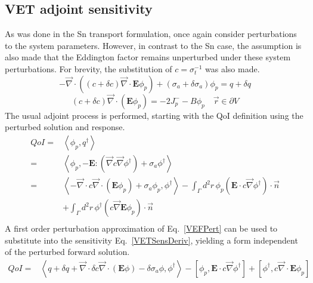 \documentclass{article}
\newcommand{\vr}{\vec{r}}
\newcommand{\bra}{\left\langle}
\newcommand{\ket}{\right\rangle}
\newcommand{\sbra}{\left[}
\newcommand{\sket}{\right]}
\newcommand{\vdiv}{\vec{\nabla} \cdot}
\newcommand{\vgrad}{\vec{\nabla}}
\newcommand{\bound}{\partial V}
\newcommand{\Edd}{\mathbf{E}}
\newcommand{\sigt}{\sigma_t}
\newcommand{\siga}{\sigma_a}
\newcommand{\isigt}{c}
\newcommand{\scalSource}{q}
\newcommand{\scalResp}{q^\dag}
\newcommand{\qoi}{QoI}
\begin{document}
\subsection{VET adjoint sensitivity}

As was done in the Sn transport formulation, once again consider perturbations to the system parameters. However, in contrast to the Sn case, the assumption is also made that the Eddington factor remains unperturbed under these system perturbations. For brevity, the substitution of $\isigt = \sigt^{-1}$ was also made.
\begin{equation}
\label{VEFPert}
- \vdiv \left((\isigt + \delta \isigt)\vdiv \Edd \phi_p \right) + (\siga + \delta \siga)\phi_p = \scalSource + \delta \scalSource
\end{equation}
\begin{equation}
(\isigt + \delta \isigt) \vec{\nabla} \cdot \left(\Edd \phi_p \right)  = - 2J_p^- - B \phi_p \quad \vr \in \bound
\end{equation}
The usual adjoint process is performed, starting with the QoI definition using the perturbed solution and response. 
\begin{equation}
\label{VETSensDeriv}
\begin{split}
\qoi=&\bra \phi_p , \scalResp \ket \\
=&\bra \phi_p , - \Edd : \left( \vgrad \isigt \vgrad \phi^\dag \right) + \siga \phi^\dag \ket \\
=& \bra - \vdiv \isigt \vdiv \left( \Edd \phi_p \right) + \siga \phi_p, \phi^\dag \ket 
- \int_\Gamma d^2 r \, \phi_p \left( \Edd \cdot \isigt \vgrad \phi^\dag \right) \cdot \vec{n}  \\ 
&+ \int_\Gamma d^2 r \, \phi^\dag \left(  \isigt \vgrad \Edd \phi_p \right) \cdot \vec{n} \\
\end{split}
\end{equation}
A first order perturbation approximation of Eq.~\eqref{VEFPert} can be used to substitute into the sensitivity Eq.~\eqref{VETSensDeriv}, yielding a form independent of the perturbed forward solution.
\begin{equation}
\label{QoIVETAdjNoBC}
\begin{split}
\qoi =& \bra \scalSource + \delta \scalSource + \vdiv \delta \isigt \vdiv \left( \Edd \phi \right) - \delta \siga \phi, \phi^\dag \ket - \sbra \phi_p, \Edd \cdot \isigt \vgrad \phi^\dag \sket + \sbra \phi^\dag, \isigt \vdiv \Edd \phi_p \sket 
\end{split}
\end{equation}
\end{document}
